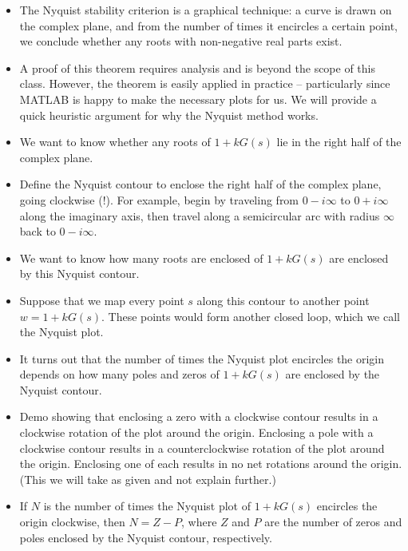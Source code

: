 \documentclass{article}
\begin{document}
\begin{itemize}
\item The Nyquist stability criterion is a graphical technique: a curve is drawn on the complex plane, and from the number of times it encircles a certain point, we conclude whether any roots with non-negative real parts exist.

\item A proof of this theorem requires analysis and is beyond the scope of this class. However, the theorem is easily applied in practice -- particularly since MATLAB is happy to make the necessary plots for us. We will provide a quick heuristic argument for why the Nyquist method works.

\item We want to know whether any roots of $1 + kG(s)$ lie in the right half of the complex plane.

\item Define the Nyquist contour to enclose the right half of the complex plane, going clockwise (!). For example, begin by traveling from $0 - i \infty$ to $0 + i \infty $ along the imaginary axis, then travel along a semicircular arc with radius $\infty$ back to $0 - i \infty$.

\item We want to know how many roots are enclosed of $1 + kG(s)$ are enclosed by this Nyquist contour.

\item Suppose that we map every point $s$ along this contour to another point $w = 1 + k G(s)$. These points would form another closed loop, which we call the Nyquist plot.

\item It turns out that the number of times the Nyquist plot encircles the origin depends on how many poles and zeros of $1 + kG(s)$ are enclosed by the Nyquist contour.

\item Demo showing that enclosing a zero with a clockwise contour results in a clockwise rotation of the plot around the origin. Enclosing a pole with a clockwise contour results in a counterclockwise rotation of the plot around the origin. Enclosing one of each results in no net rotations around the origin. (This we will take as given and not explain further.)

\item If $N$ is the number of times the Nyquist plot of $1 + kG(s)$ encircles the origin clockwise, then $N = Z - P$, where $Z$ and $P$ are the number of zeros and poles enclosed by the Nyquist contour, respectively.


\end{itemize}
\end{document}

